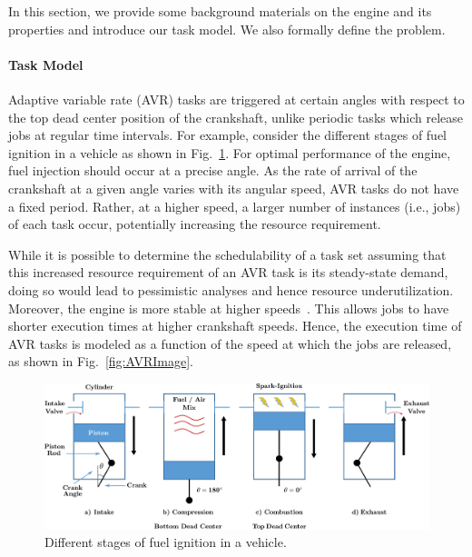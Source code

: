 In this section, we provide some background materials on the engine and its properties and introduce our task model.
We also formally define the problem.
\paragraph{Task Model}
Adaptive variable rate (AVR) tasks are triggered at certain angles with respect to the top dead center position of the crankshaft, unlike periodic tasks which release jobs at regular time intervals.
For example, consider the different stages of fuel ignition in a vehicle as shown in Fig.~\ref{fig:Engine}.
For optimal performance of the engine, fuel injection should occur at a precise angle.
As the rate of arrival of the crankshaft at a given angle varies with its angular speed, AVR tasks do not have a fixed period.
Rather, at a higher speed, a larger number of instances (i.e., jobs) of each task occur, potentially increasing the resource requirement.

While it is possible to determine the schedulability of a task set assuming that this increased resource requirement of an AVR task is its steady-state demand, doing so would lead to pessimistic analyses and hence resource underutilization.
Moreover, the engine is more stable at higher speeds~\cite{dbuttle_real-time_nodate}.
This allows jobs to have shorter execution times at higher crankshaft speeds.
Hence, the execution time of AVR tasks is modeled as a function of the speed at which the jobs are released, as shown in Fig.~\ref{fig:AVRImage}.


\begin{figure}
    \centering
    \includegraphics[width=0.9\linewidth]{fig/vectorEngineIsolated.pdf}
    \caption{Different stages of fuel ignition in a vehicle.}
    \label{fig:Engine}
\end{figure}

